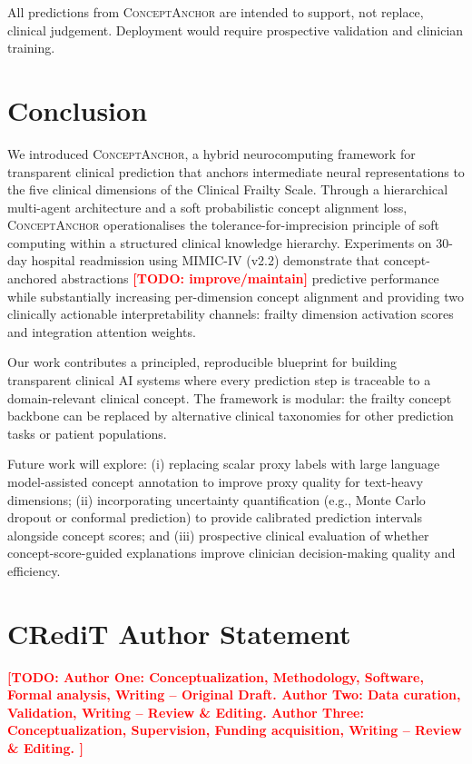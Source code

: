 \documentclass[review,12pt,authoryear]{elsarticle}
\newcommand{\todo}[1]{\textcolor{red}{\textbf{[TODO: #1]}}}
\newcommand{\modelname}{\textsc{ConceptAnchor}}
\newcommand{\dataset}{MIMIC-IV (v2.2)}
\begin{document}
All predictions from \modelname{} are intended to support, not replace, clinical judgement.
Deployment would require prospective validation and clinician training.

\section{Conclusion}
\label{sec:conclusion}

We introduced \modelname, a hybrid neurocomputing framework for transparent clinical prediction that anchors intermediate neural representations to the five clinical dimensions of the Clinical Frailty Scale.
Through a hierarchical multi-agent architecture and a soft probabilistic concept alignment loss, \modelname{} operationalises the tolerance-for-imprecision principle of soft computing \citep{zadeh1994soft} within a structured clinical knowledge hierarchy.
Experiments on 30-day hospital readmission using \dataset{} demonstrate that concept-anchored abstractions \todo{improve/maintain} predictive performance while substantially increasing per-dimension concept alignment and providing two clinically actionable interpretability channels: frailty dimension activation scores and integration attention weights.

Our work contributes a principled, reproducible blueprint for building transparent clinical AI systems where every prediction step is traceable to a domain-relevant clinical concept.
The framework is modular: the frailty concept backbone can be replaced by alternative clinical taxonomies for other prediction tasks or patient populations.

Future work will explore: (i) replacing scalar proxy labels with large language model-assisted concept annotation to improve proxy quality for text-heavy dimensions; (ii) incorporating uncertainty quantification (e.g., Monte Carlo dropout or conformal prediction) to provide calibrated prediction intervals alongside concept scores; and (iii) prospective clinical evaluation of whether concept-score-guided explanations improve clinician decision-making quality and efficiency.


\section*{CRediT Author Statement}
\todo{
\textbf{Author One}: Conceptualization, Methodology, Software, Formal analysis, Writing -- Original Draft.
\textbf{Author Two}: Data curation, Validation, Writing -- Review \& Editing.
\textbf{Author Three}: Conceptualization, Supervision, Funding acquisition, Writing -- Review \& Editing.
}
\end{document}
